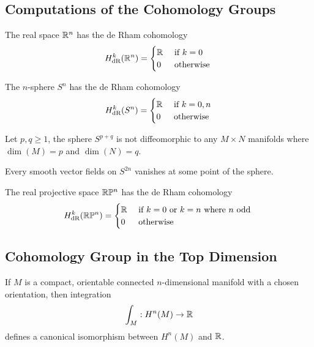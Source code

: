 \documentclass[a4paper]{article}
\begin{document}
\subsection{Computations of the Cohomology Groups}
\begin{prp}{}{} The real space $\mathbb{R}^n$ has the de Rham cohomology $$H_{\text{dR}}^k(\mathbb{R}^n)=\begin{cases}
\mathbb{R} & \text{ if }k=0\\
0 & \text{ otherwise }
\end{cases}$$
\end{prp}

\begin{prp}{}{} The $n$-sphere $S^n$ has the de Rham cohomology $$H_{\text{dR}}^k(S^n)=\begin{cases}
\mathbb{R} & \text{ if }k=0,n\\
0 & \text{ otherwise }
\end{cases}$$
\end{prp}

\begin{thm}{}{} Let $p,q\geq 1$, the sphere $S^{p+q}$ is not diffeomorphic to any $M\times N$ manifolds where $\dim(M)=p$ and $\dim(N)=q$. 
\end{thm}

\begin{prp}{}{} Every smooth vector fields on $S^{2n}$ vanishes at some point of the sphere. 
\end{prp}

\begin{prp}{}{} The real projective space $\mathbb{R}\mathbb{P}^n$ has the de Rham cohomology $$H_{\text{dR}}^k(\mathbb{R}\mathbb{P}^n)=\begin{cases}
\mathbb{R} & \text{ if }k=0\text{ or }k=n\text{ where }n\text{ odd }\\
0 & \text{ otherwise }
\end{cases}$$
\end{prp}

\subsection{Cohomology Group in the Top Dimension}
\begin{thm}{}{} If $M$ is a compact, orientable connected $n$-dimensional manifold with a chosen orientation, then integration $$\int_M:H^n(M)\to\mathbb{R}$$ defines a canonical isomorphism between $H^n(M)$ and $\mathbb{R}$. 
\end{thm}
\end{document}
